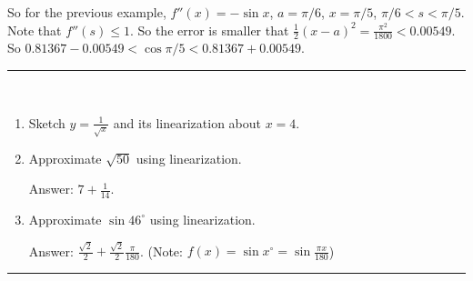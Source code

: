 \documentclass[calc1-main.tex]{subfiles}
\begin{document}
So for the previous example, $f''(x) = -\sin x$, $a=\pi/6$, $x=\pi/5$, $\pi/6<s<\pi/5$. Note that $f''(s) \le 1$. So the error is smaller that $\frac{1}{2}(x-a)^2 = \frac{\pi^2}{1800}<0.00549$. So $0.81367 -0.00549 < \cos \pi/5 < 0.81367 + 0.00549$.

\rule{\textwidth}{1pt}
\begin{multicols}{2}
\begin{exercise}
~\\
  \begin{enumerate}
    \item Sketch $y=\frac{1}{\sqrt{x}}$ and its linearization about $x=4$.
    \item Approximate $\sqrt{50}$ using linearization.

    Answer: $7+ \frac{1}{14}$.
    \item Approximate $\sin 46^{\circ}$ using linearization.

    Answer: $\frac{\sqrt{2}}{2} + \frac{\sqrt{2}}{2} \frac{\pi}{180}$. (Note: $f(x) = \sin x^{\circ} = \sin \frac{\pi x}{180}$)
  \end{enumerate}
\end{exercise}
\end{multicols}
\rule{\textwidth}{1pt}
\end{document}
